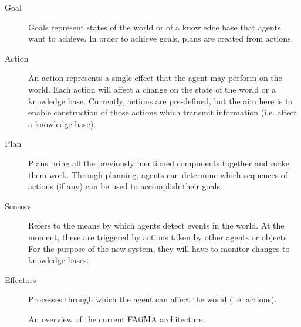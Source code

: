 \documentclass{article}
\begin{document}
\begin{description}
\item[Goal]
  Goals represent states of the world or of a knowledge base that agents want
  to achieve.  In order to achieve goals, plans are created from actions.

\item[Action]
  An action represents a single effect that the agent may perform on the world.
  Each action will affect a change on the state of the world or a knowledge base.
  Currently, actions are pre-defined, but the aim here is to enable construction
  of those actions which transmit information (i.e. affect a knowledge base).

\item[Plan]
  Plans bring all the previously mentioned components together and make them
  work.  Through planning, agents can determine which sequences of actions (if any)
  can be used to accomplish their goals.

\item[Sensors]
  Refers to the means by which agents detect events in the world.  At the moment,
  these are triggered by actions taken by other agents or objects.  For the 
  purpose of the new system, they will have to monitor changes to knowledge bases.

\item[Effectors]
  Processes through which the agent can affect the world (i.e. actions).

\end{description}

\begin{figure}[h]
  \caption{An overview of the current FAtiMA architecture\cite{Paiva2005}. }
  \label{fatima_diagram}
\end{figure}
\end{document}
